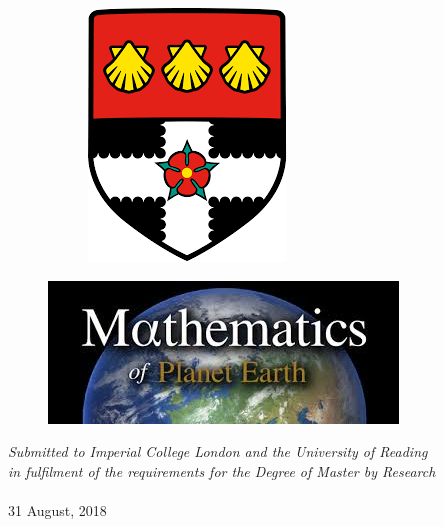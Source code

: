 \documentclass[12pt,a4paper]{article}
\theoremstyle{definition}
\begin{document}
\begin{titlepage}
\begin{figure}[H]
\begin{subfigure}[b]{.1263\linewidth}
				\includegraphics[width=\linewidth]{uor_logo_big}
				\label{uor_logo_big}
			\end{subfigure}
			\centering
		\end{figure}
	\vspace{-14mm}
		\begin{figure}[H]
			\includegraphics[width=.3\linewidth]{mpe_cdt_logo}
			\centering
		\end{figure}
		\vfill %
		\textit{Submitted to Imperial College London and the University of Reading \\in fulfilment of the
			requirements for the Degree of Master by Research\\ $\,$\\} %
		31 August, 2018 %
		
		
	\end{titlepage}
\end{document}
